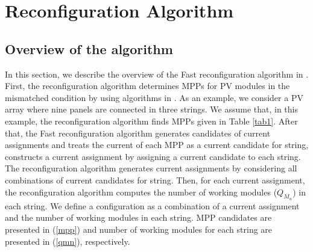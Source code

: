\documentclass[conference]{IEEEtran}
\begin{document}
\section{Reconfiguration Algorithm} \label{algo}

\subsection{Overview of the algorithm}
In this section, we describe the overview of the Fast reconfiguration algorithm in \cite{b10}. First, the reconfiguration algorithm determines MPPs for PV modules in the mismatched condition by using algorithms in \cite{b6}\cite{b7}. As an example, we consider a PV array where nine panels are connected in three strings. We assume that, in this example, the reconfiguration algorithm finds MPPs given in Table \ref{tab1}.
After that, the Fast reconfiguration algorithm generates candidates of current assignments 
and treats the current of each MPP as a current candidate for string, constructs a current assignment by assigning a current candidate to each string. The reconfiguration algorithm generates current assignments by considering all combinations of current candidates for string.
Then, for each current assignment, the reconfiguration algorithm computes the number of working modules (\textit{$Q_{M_n}$}) in each string. We define a configuration as a combination of a current assignment and the number of working modules in each string. MPP candidates are presented in (\ref{mpp}) and number of working modules for each string are presented in (\ref{qmn}), respectively. 
\end{document}
